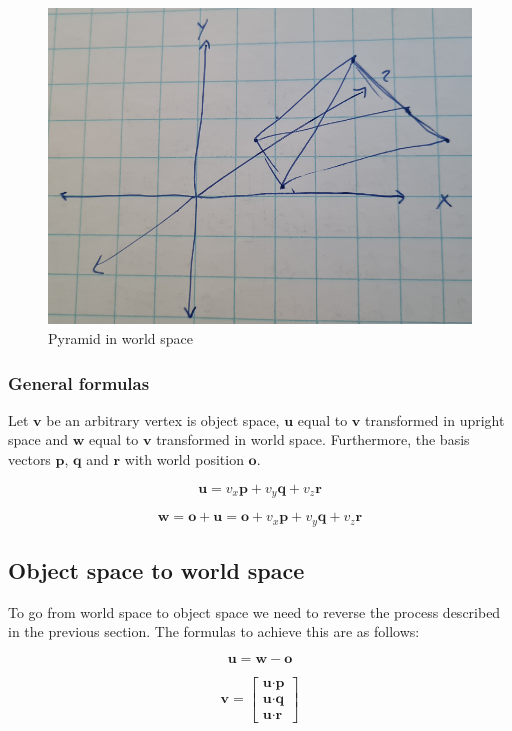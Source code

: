 \documentclass[a4paper,11pt]{article}
\begin{document}
\begin{figure}[H]
\centering
    \includegraphics[scale=0.65]{03_world_space}
\caption{Pyramid in world space}
\label{fig:pyramid-world-space}
\end{figure}

\subsubsection{General formulas}

Let $\textbf{v}$ be an arbitrary vertex is object space, $\textbf{u}$ equal to $\textbf{v}$ transformed in upright space and $\textbf{w}$ equal to $\textbf{v}$ transformed in world space. Furthermore, the basis vectors $\textbf{p}$, $\textbf{q}$ and $\textbf{r}$ with world position $\textbf{o}$.

$$\textbf{u}=v_x\textbf{p}+v_y\textbf{q}+v_z\textbf{r}$$

$$\textbf{w}=\textbf{o}+\textbf{u}=\textbf{o}+v_x\textbf{p}+v_y\textbf{q}+v_z\textbf{r}$$

\subsection{Object space to world space}

To go from world space to object space we need to reverse the process described in the previous section. The formulas to achieve this are as follows:

$$\textbf{u}=\textbf{w}-\textbf{o}$$

$$\textbf{v}=\begin{bmatrix}
\textbf{u}\cdot\textbf{p} \\ \textbf{u}\cdot\textbf{q} \\ \textbf{u}\cdot\textbf{r}
\end{bmatrix}$$
\end{document}

